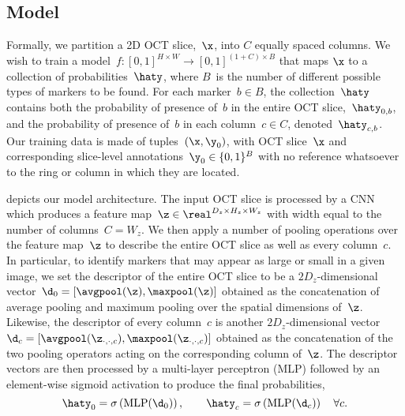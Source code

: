 \subsection{Model}



Formally, we partition a 2D OCT slice,~$\x$, into $C$ equally spaced columns. We wish to train a model~$f:[0,1]^{H\times W} \to [0,1]^{(1+C)\times B}$ that maps $\x$ to a collection of probabilities~$\haty$, where $B$~is the number of different possible types of markers to be found. For each marker~$b\in B$, the collection~$\haty$ contains both the probability of presence of~$b$ in the entire OCT slice,~$\haty_{0,b}$, and the probability of presence of~$b$ in each column~$c\in C$, denoted~$\haty_{c, b}$. Our training data is made of tuples~$(\x, \y_0)$, with OCT slice~$\x$ and corresponding slice-level annotations~$\y_0\in\{0, 1\}^B$ with no reference whatsoever to the ring or column in which they are located.


 depicts our model architecture. The input OCT slice is processed by a CNN which produces a feature map~$\z \in \real^{D_z\times H_z\times W_z}$ with width equal to the number of columns~$C = W_z$. We then apply a number of pooling operations over the feature map~$\z$ to describe the entire OCT slice as well as every column~$c$. In particular, to identify markers that may appear as large or small in a given image, we set the descriptor of the entire OCT slice to be a $2D_z$-dimensional vector~$\d_0=[\avgpool(\z), \maxpool(\z)]$ obtained as the concatenation of average pooling and maximum pooling over the spatial dimensions of~$\z$. Likewise, the descriptor of every column~$c$ is another $2D_z$-dimensional vector~$\d_c=[\avgpool(\z_{\cdot,\cdot,c}), \maxpool(\z_{\cdot,\cdot,c})]$ obtained as the concatenation of the two pooling operators acting on the corresponding column of~$\z$. The descriptor vectors are then processed by a multi-layer perceptron (MLP) followed by an element-wise sigmoid activation to produce the final probabilities,
\begin{equation}
    \haty_0 = \sigma\left(\textrm{MLP}(\d_0)\right),\quad \quad 
    \haty_c = \sigma\left(\textrm{MLP}(\d_c)\right) \quad \forall c.
\end{equation}



